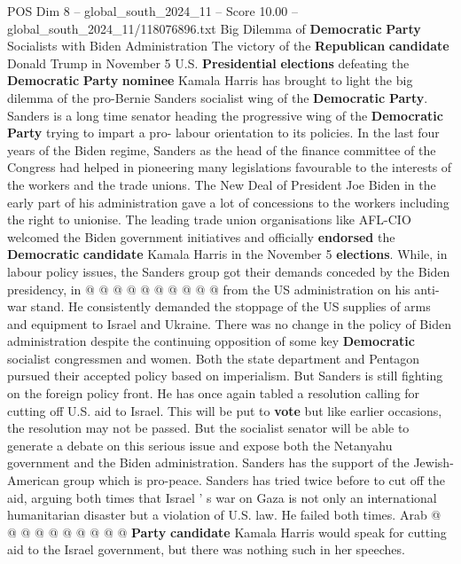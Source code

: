 \begin{textsample}{POS Dim 8 – global\_south\_2024\_11 – Score 10.00 – global\_south\_2024\_11/118076896.txt}  \label{ex:f8_pos_146}
Big Dilemma of \textbf{Democratic} \textbf{Party} Socialists with Biden Administration The victory of the \textbf{Republican} \textbf{candidate} Donald Trump in November 5 U.S. \textbf{Presidential} \textbf{elections} defeating the \textbf{Democratic} \textbf{Party} \textbf{nominee} Kamala Harris has brought to light the big dilemma of the pro-Bernie Sanders socialist wing of the \textbf{Democratic} \textbf{Party}.
Sanders is a long time senator heading the progressive wing of the \textbf{Democratic} \textbf{Party} trying to impart a pro- labour orientation to its policies.
In the last four years of the Biden regime, Sanders as the head of the finance committee of the Congress had helped in pioneering many legislations favourable to the interests of the workers and the trade unions.
The New Deal of President Joe Biden in the early part of his administration gave a lot of concessions to the workers including the right to unionise.
The leading trade union organisations like AFL-CIO welcomed the Biden government initiatives and officially \textbf{endorsed} the \textbf{Democratic} \textbf{candidate} Kamala Harris in the November 5 \textbf{elections}.
While, in labour policy issues, the Sanders group got their demands conceded by the Biden presidency, in @ @ @ @ @ @ @ @ @ @ from the US administration on his anti-war stand.
He consistently demanded the stoppage of the US supplies of arms and equipment to Israel and Ukraine.
There was no change in the policy of Biden administration despite the continuing opposition of some key \textbf{Democratic} socialist congressmen and women.
Both the state department and Pentagon pursued their accepted policy based on imperialism.
But Sanders is still fighting on the foreign policy front.
He has once again tabled a resolution calling for cutting off U.S. aid to Israel.
This will be put to \textbf{vote} but like earlier occasions, the resolution may not be passed.
But the socialist senator will be able to generate a debate on this serious issue and expose both the Netanyahu government and the Biden administration.
Sanders has the support of the Jewish- American group which is pro-peace.
Sanders has tried twice before to cut off the aid, arguing both times that Israel ' s war on Gaza is not only an international humanitarian disaster but a violation of U.S. law.
He failed both times.
Arab @ @ @ @ @ @ @ @ @ @ \textbf{Party} \textbf{candidate} Kamala Harris would speak for cutting aid to the Israel government, but there was nothing such in her speeches.

\end{textsample}
